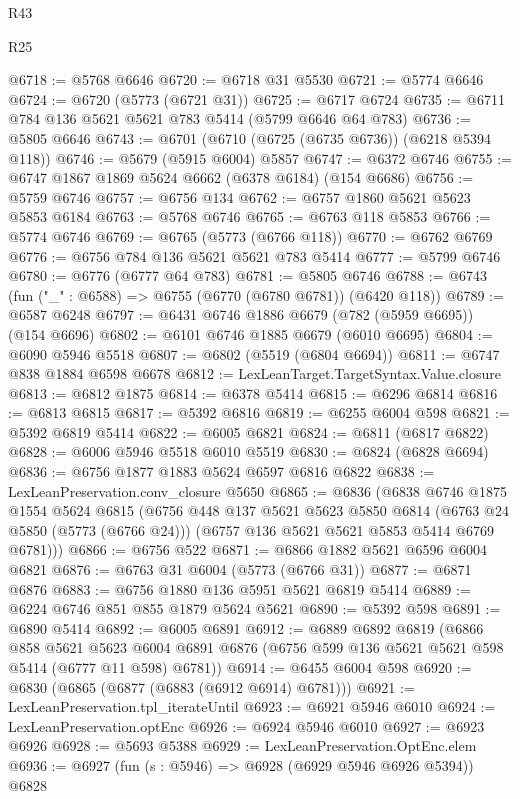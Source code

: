 \begin{lexlean}{R43}
\begin{lexlean}{R25}
\begin{coremodule}
{{{{{{{{{{{{{{{{{{{{{{{{{{{{{{{{{{{{{{{{{{{{{{{{{{{{{{{{{{{{{{{{{{{{{{{{{{{{{{{{{{{{{{{{{{{{{{{{{{{{{{{{{{{{{{{{{{{{{{{{{{{{{{{{{{{{{{{{{{{{{{{{{{{{{{{{{{{{{{{{{{{{{{{{{{{{{{{{{{{{{{{{{{{{{{{{{@6718 := @5768 @6646
@6720 := @6718 @31 @5530
@6721 := @5774 @6646
@6724 := @6720 (@5773 (@6721 @31))
@6725 := @6717 @6724
@6735 := @6711 @784 @136 @5621 @5621 @783 @5414 (@5799 @6646 @64 @783)
@6736 := @5805 @6646
@6743 := @6701 (@6710 (@6725 (@6735 @6736)) (@6218 @5394 @118))
@6746 := @5679 (@5915 @6004) @5857
@6747 := @6372 @6746
@6755 := @6747 @1867 @1869 @5624 @6662 (@6378 @6184) (@154 @6686)
@6756 := @5759 @6746
@6757 := @6756 @134
@6762 := @6757 @1860 @5621 @5623 @5853 @6184
@6763 := @5768 @6746
@6765 := @6763 @118 @5853
@6766 := @5774 @6746
@6769 := @6765 (@5773 (@6766 @118))
@6770 := @6762 @6769
@6776 := @6756 @784 @136 @5621 @5621 @783 @5414
@6777 := @5799 @6746
@6780 := @6776 (@6777 @64 @783)
@6781 := @5805 @6746
@6788 := @6743 (fun ("_" : @6588) => @6755 (@6770 (@6780 @6781)) (@6420 @118))
@6789 := @6587 @6248
@6797 := @6431 @6746 @1886 @6679 (@782 (@5959 @6695)) (@154 @6696)
@6802 := @6101 @6746 @1885 @6679 (@6010 @6695)
@6804 := @6090 @5946 @5518
@6807 := @6802 (@5519 (@6804 @6694))
@6811 := @6747 @838 @1884 @6598 @6678
@6812 := LexLeanTarget.TargetSyntax.Value.closure
@6813 := @6812 @1875
@6814 := @6378 @5414
@6815 := @6296 @6814
@6816 := @6813 @6815
@6817 := @5392 @6816
@6819 := @6255 @6004 @598
@6821 := @5392 @6819 @5414
@6822 := @6005 @6821
@6824 := @6811 (@6817 @6822)
@6828 := @6006 @5946 @5518 @6010 @5519
@6830 := @6824 (@6828 @6694)
@6836 := @6756 @1877 @1883 @5624 @6597 @6816 @6822
@6838 := LexLeanPreservation.conv_closure @5650
@6865 := @6836
    (@6838
      @6746
      @1875
      @1554
      @5624
      @6815
      (@6756
        @448
        @137
        @5621
        @5623
        @5850
        @6814
        (@6763 @24 @5850 (@5773 (@6766 @24)))
        (@6757 @136 @5621 @5621 @5853 @5414 @6769 @6781)))
@6866 := @6756 @522
@6871 := @6866 @1882 @5621 @6596 @6004 @6821
@6876 := @6763 @31 @6004 (@5773 (@6766 @31))
@6877 := @6871 @6876
@6883 := @6756 @1880 @136 @5951 @5621 @6819 @5414
@6889 := @6224 @6746 @851 @855 @1879 @5624 @5621
@6890 := @5392 @598
@6891 := @6890 @5414
@6892 := @6005 @6891
@6912 := @6889
    @6892
    @6819
    (@6866
      @858
      @5621
      @5623
      @6004
      @6891
      @6876
      (@6756 @599 @136 @5621 @5621 @598 @5414 (@6777 @11 @598) @6781))
@6914 := @6455 @6004 @598
@6920 := @6830 (@6865 (@6877 (@6883 (@6912 @6914) @6781)))
@6921 := LexLeanPreservation.tpl_iterateUntil
@6923 := @6921 @5946 @6010
@6924 := LexLeanPreservation.optEnc
@6926 := @6924 @5946 @6010
@6927 := @6923 @6926
@6928 := @5693 @5388
@6929 := LexLeanPreservation.OptEnc.elem
@6936 := @6927 (fun (s : @5946) => @6928 (@6929 @5946 @6926 @5394)) @6828
}}}}}}}}}}}}}}}}}}}}}}}}}}}}}}}}}}}}}}}}}}}}}}}}}}}}}}}}}}}}}}}}}}}}}}}}}}}}}}}}}}}}}}}}}}}}}}}}}}}}}}}}}}}}}}}}}}}}}}}}}}}}}}}}}}}}}}}}}}}}}}}}}}}}}}}}}}}}}}}}}}}}}}}}}}}}}}}}}}}}}}}}}}}}}}}}}
\end{coremodule}
\end{lexlean}
\end{lexlean}
